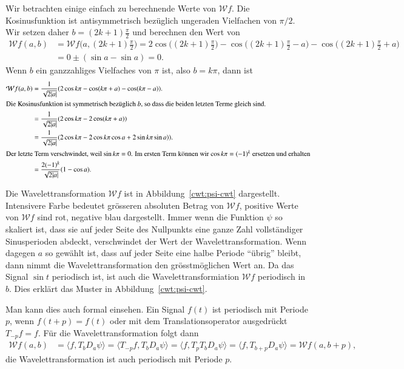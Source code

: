 \begin{beispiel}
Wir betrachten einige einfach zu berechnende Werte von $\mathcal{W}f$.
Die Kosinusfunktion ist antisymmetrisch bezüglich ungeraden Vielfachen
von $\pi/2$.
Wir setzen daher $b=(2k+1)\frac{\pi}2$ und berechnen den Wert von
\begin{align*}
\mathcal{W}f(a,b)
&=
\mathcal{W}f\biggl(a,(2k+1)\frac{\pi}2\biggr)
=
2\cos\biggl((2k+1)\frac{\pi}2\biggr)
-\cos\biggl((2k+1)\frac{\pi}2 -a\biggr)
-\cos\biggl((2k+1)\frac{\pi}2 +a\biggr)
\\
&=
0
\pm(\sin a - \sin a)
=0.
\end{align*}
Wenn $b$ ein ganzzahliges Vielfaches von $\pi$ ist, also $b=k\pi$, dann ist 
\begin{align*}
\mathcal{W}f(a,b)
&=
\frac{1}{\sqrt{2|a|}}(2\cos k\pi - \cos(k\pi +a) -\cos(k\pi-a)).
\\
\intertext{Die Kosinusfunktion ist symmetrisch bezüglich $b$, so dass die
beiden letzten Terme gleich sind.  }
&=
\frac{1}{\sqrt{2|a|}}(2\cos k\pi - 2\cos(k\pi +a))
\\
&=
\frac{1}{\sqrt{2|a|}}(2\cos k\pi - 2\cos k\pi \cos a + 2 \sin k\pi \sin a)).
\\
\intertext{Der letzte Term verschwindet, weil $\sin k\pi=0$.
Im ersten Term können wir $\cos k\pi=(-1)^k$ ersetzen und erhalten}
&=
\frac{2(-1)^k}{\sqrt{2|a|}}(1 - \cos a).
\end{align*}

Die Wavelettransformation $\mathcal{W}f$ ist in Abbildung~\ref{cwt:psi-cwt}
dargestellt.
Intensivere Farbe bedeutet grösseren absoluten Betrag von $\mathcal{W}f$,
positive Werte von $\mathcal{W}f$ sind rot, negative blau dargestellt.
Immer wenn die Funktion $\psi$ so skaliert ist, dass sie auf jeder
Seite des Nullpunkts eine ganze Zahl vollständiger Sinusperioden abdeckt,
verschwindet der Wert der Wavelettransformation.
Wenn dagegen $a$ so gewählt ist, dass auf jeder Seite eine halbe Periode
``übrig'' bleibt, dann nimmt die Wavelettransformation den grösstmöglichen
Wert an.
Da das Signal $\sin t$ periodisch ist, ist auch die Wavelettransformiation
$\mathcal{W}f$ periodisch in $b$.
Dies erklärt das Muster in Abbildung~\ref{cwt:psi-cwt}.

Man kann dies auch formal einsehen. 
Ein Signal $f(t)$ ist periodisch mit Periode $p$, wenn $f(t+p) = f(t)$
oder mit dem Translationsoperator ausgedrückt $T_{-p}f=f$.
Für die Wavelettransformation folgt dann
\begin{align*}
\mathcal{W}f(a,b)
&=
\langle f,T_bD_a\psi\rangle
=
\langle T_{-p}f,T_bD_a\psi\rangle
=
\langle f,T_pT_bD_a\psi\rangle
=
\langle f, T_{b+p}D_a\psi\rangle
=
\mathcal{W}f(a,b+p),
\end{align*}
die Wavelettransformation ist auch periodisch mit Periode $p$.
\end{beispiel}

